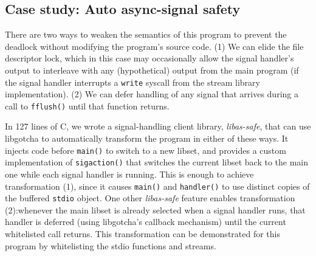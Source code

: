 \subsection{Case study: Auto async-signal safety}
\label{sec:statefulness}

There are two ways to weaken the semantics of this program to prevent the deadlock
without modifying the program's source code.  (1) We can elide the file descriptor
lock, which in this case may occasionally allow the signal handler's output to
interleave with any (hypothetical) output from the main program (if the signal
handler interrupts a \texttt{write} syscall from the stream library implementation).
(2) We can defer handling of any signal that arrives during a call to
\texttt{fflush()} until that function returns.

In 127 lines of C, we wrote a signal-handling client library, \textit{libas-safe},
that can use libgotcha to automatically transform the program in either of these
ways.  It
injects code before \texttt{main()} to switch to a new libset, and provides a custom
implementation of \texttt{sigaction()} that switches the current libset back to the
main one while each signal handler is running.  This is enough to achieve
transformation (1), since it causes \texttt{main()} and \texttt{handler()} to use
distinct copies of the buffered \texttt{stdio} object.  One other \textit{libas-safe}
feature enables transformation (2):\@ whenever the main libset is already selected
when a signal handler runs, that handler is deferred (using libgotcha's callback
mechanism) until the current whitelisted call returns.  This transformation can be
demonstrated for this program by whitelisting the stdio functions and streams.





